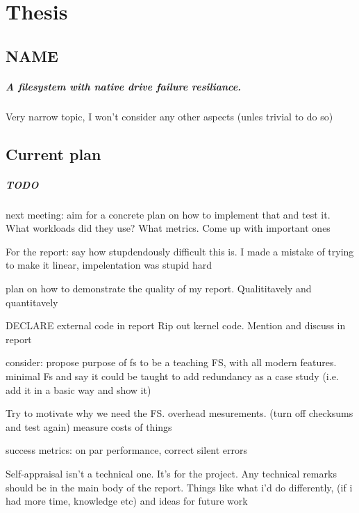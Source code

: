 \documentclass[a4paper]{report}
\begin{document}
\chapter{Thesis}
    \section{NAME}
        \paragraph{A filesystem with native drive failure resiliance.}
        Very narrow topic, I won't consider any other aspects (unles trivial to
        do so)

    \section{Current plan}
        \paragraph{TODO} next meeting: aim for a concrete plan on how to implement that and
        test it. What workloads did they use? What metrics. Come up with important ones

        For the report: say how stupdendously difficult this is. I made a mistake
        of trying to make it linear, impelentation was stupid hard

        plan on how to demonstrate the quality of my report. Qualititavely and
        quantitavely

        DECLARE external code in report
        Rip out kernel code. Mention and discuss in report

        consider: propose purpose of fs to be a teaching FS, with all modern
        features. minimal Fs and say it could be taught to add redundancy as a
        case study (i.e. add it in a basic way and show it)

        Try to motivate why we need the FS.
        overhead mesurements. (turn off checksums and test again) measure costs
        of things

        success metrics: on par performance, correct silent errors

        Self-appraisal isn't a technical one. It's for the project. Any
        technical remarks should be in the main body of the report. Things like
        what i'd do differently, (if i had more time, knowledge etc) and ideas
        for future work
\end{document}
